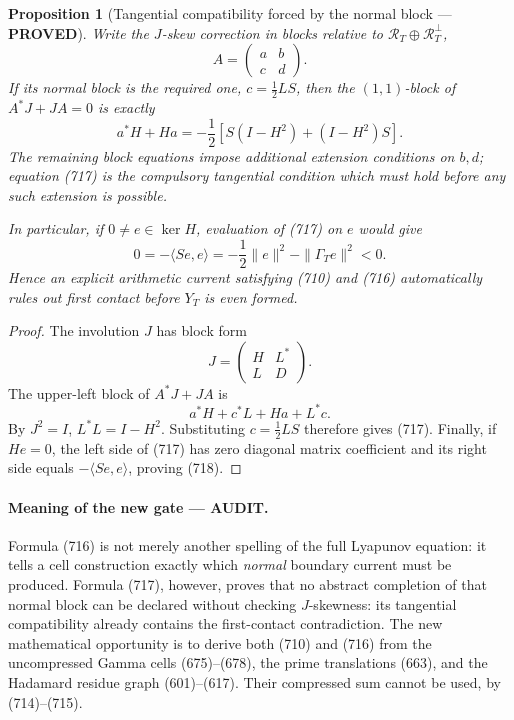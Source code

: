 \documentclass[11pt]{article}
\newtheorem{proposition}[theorem]{Proposition}
\newcommand{\PROVED}{\textcolor{green!45!black}{\textbf{PROVED}}}
\newcommand{\AUDIT}{\textcolor{orange!75!black}{\textbf{AUDIT}}}
\begin{document}
\begin{proposition}[Tangential compatibility forced by the normal block ---
\PROVED]
Write the \(J\)-skew correction in blocks relative to
\(\mathscr R_T\oplus\mathscr R_T^\perp\),
\[
 A=\begin{pmatrix}a&b\\c&d\end{pmatrix}.
\]
If its normal block is the required one,
\(c=\frac12LS\), then the \((1,1)\)-block of
\(A^*J+JA=0\) is exactly
\begin{equation}
 \boxed{
 a^*H+Ha
 =-\frac12\left[
 S(I-H^2)+(I-H^2)S\right].}                         \tag{717}
\end{equation}
The remaining block equations impose additional extension conditions on
\(b,d\); equation (717) is the compulsory tangential condition which must
hold before any such extension is possible.

In particular, if \(0\ne e\in\ker H\), evaluation of (717) on \(e\)
would give
\begin{equation}
 0=-\langle Se,e\rangle
   =-\frac12\|e\|^2-\|\Gamma_Te\|^2<0.              \tag{718}
\end{equation}
Hence an explicit arithmetic current satisfying (710) and (716)
automatically rules out first contact before \(Y_T\) is even formed.
\end{proposition}

\begin{proof}
The involution \(J\) has block form
\[
 J=\begin{pmatrix}H&L^*\\L&D\end{pmatrix}.
\]
The upper-left block of \(A^*J+JA\) is
\[
 a^*H+c^*L+Ha+L^*c.
\]
By \(J^2=I\), \(L^*L=I-H^2\).  Substituting
\(c=\frac12LS\) therefore gives (717).  Finally, if \(He=0\), the
left side of (717) has zero diagonal matrix coefficient and its right side
equals \(-\langle Se,e\rangle\), proving (718).
\end{proof}

\paragraph{Meaning of the new gate --- \AUDIT.}
Formula (716) is not merely another spelling of the full Lyapunov equation:
it tells a cell construction exactly which \emph{normal} boundary current
must be produced.  Formula (717), however, proves that no abstract
completion of that normal block can be declared without checking
\(J\)-skewness: its tangential compatibility already contains the
first-contact contradiction.  The new mathematical opportunity is to
derive both (710) and (716) from the uncompressed Gamma cells (675)--(678),
the prime translations (663), and the Hadamard residue graph (601)--(617).
Their compressed sum cannot be used, by (714)--(715).
\end{document}
